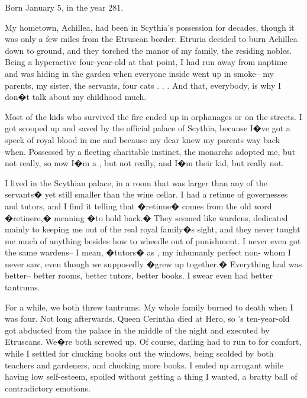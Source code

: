 \documentclass[char]{Kos}
\begin{document}
\name{\cWard{}}

Born January 5, in the year 281.

My hometown, Achillea, had been in Scythia's possession for decades, though it was only a few miles from the Etruscan border. Etruria decided to burn Achillea down to ground, and they torched the manor of my family, the residing nobles. Being a hyperactive four-year-old at that point, I had run away from naptime and was hiding in the garden when everyone inside went up in smoke-- my parents, my sister, the servants, four cats . . . And that, everybody, is why I don�t talk about my childhood much.

Most of the kids who survived the fire ended up in orphanages or on the streets. I got scooped up and saved by the official palace of Scythia, because I�ve got a speck of royal blood in me and because my dear \cScythiaQueen{\Monarch} \cScythiaQueen{\nickname} knew my parents way back when. Possessed by a fleeting charitable instinct, the monarchs adopted me, but not really, so now I�m a \cWard{\prince}, but not really, and I�m their kid, but really not.

I lived in the Scythian palace, in a room that was larger than any of the servants� yet still smaller than the wine cellar. I had a retinue of governesses and tutors, and I find it telling that �retinue� comes from the old word �retinere,� meaning �to hold back.� They seemed like wardens, dedicated mainly to keeping me out of the real royal family�s sight, and they never taught me much of anything besides how to wheedle out of punishment. I never even got the same wardens-- I mean, �tutors� as \cBride{\nickname}, my inhumanly perfect non-\cBride{\sibling} \cBride{\sibling} whom I never saw, even though we supposedly �grew up together.� Everything \cBride{\nickname} had was better-- better rooms, better tutors, better books. I swear \cBride{\they} even had better tantrums.

For a while, we both threw tantrums. My whole family burned to death when I was four. Not long afterwards, Queen Cerintha died at Hero, so \cBride{\nickname}'s ten-year-old \cFugitive{\sibling} \cFugitive{\nickname} got abducted from the palace in the middle of the night and executed by Etruscans. We�re both screwed up. Of course, darling \cBride{\nickname} had \cBride{\their} \cScythiaKing{\parent} \cScythiaKing{\nickname} to run to for comfort, while I settled for chucking books out the windows, being scolded by both teachers and gardeners, and chucking more books. I ended up arrogant while having low self-esteem, spoiled without getting a thing I wanted, a bratty ball of contradictory emotions. 
\end{document}
